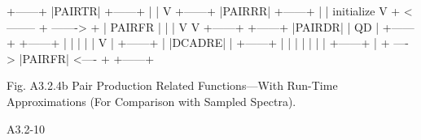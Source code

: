 \begin{center}
\begin{boxedverbatim}



                             +------+
                             |PAIRTR|
                             +------+
                                 |
                                 |
                                 V
                             +------+
                             |PAIRRR|
                             +------+
                                 |
                                 |
                      initialize V
                     + <-------- + -------> +
                     |  PAIRFR              |
                     |                      |
                     V                      V
                  +------+              +------+
                  |PAIRDR|              |  QD  |
                  +------+              +------+
                     |                      |
                     |                      |
                     |                      V
                     |                  +------+
                     |                  |DCADRE|
                     |                  +------+
                     |                      |
                     |                      |
                     |                      |
                     |       +------+       |
                     + ----> |PAIRFR| <---- +
                             +------+


     Fig. A3.2.4b  Pair Production Related Functions---With
                  Run-Time Approximations (For Comparison
                  with Sampled Spectra).







 A3.2-10
\end{boxedverbatim}
\end{center}
